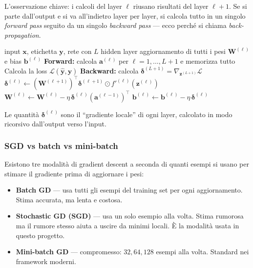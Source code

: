 \documentclass[11pt,a4paper]{article}
\begin{document}
L'osservazione chiave: i calcoli del layer $\ell$ riusano risultati del
layer $\ell+1$. Se si parte dall'output e si va all'indietro layer per
layer, si calcola tutto in un singolo \emph{forward pass} seguito da un
singolo \emph{backward pass} --- ecco perché si chiama
\emph{back-propagation}.

\begin{algorithm}[H]
\caption{Backpropagation (schema concettuale)}
\begin{algorithmic}[1]
\Require input $\bm{x}$, etichetta $\bm{y}$, rete con $L$ hidden layer
\Ensure aggiornamento di tutti i pesi $\bm{W}^{(\ell)}$ e bias $\bm{b}^{(\ell)}$
\State \textbf{Forward:} calcola $\bm{a}^{(\ell)}$ per $\ell = 1, \dots, L+1$ e memorizza tutto
\State Calcola la loss $\mathcal{L}(\hat{\bm{y}}, \bm{y})$
\State \textbf{Backward:} calcola $\bm{\delta}^{(L+1)} = \nabla_{\bm{z}^{(L+1)}} \mathcal{L}$
    \State $\bm{\delta}^{(\ell)} \gets (\bm{W}^{(\ell+1)})^\top \bm{\delta}^{(\ell+1)} \odot f'^{(\ell)}\!(\bm{z}^{(\ell)})$
\EndFor
{}
    \State $\bm{W}^{(\ell)} \gets \bm{W}^{(\ell)} - \eta\, \bm{\delta}^{(\ell)}(\bm{a}^{(\ell-1)})^\top$
    \State $\bm{b}^{(\ell)} \gets \bm{b}^{(\ell)} - \eta\, \bm{\delta}^{(\ell)}$
\EndFor
\end{algorithmic}
\end{algorithm}

Le quantità $\bm{\delta}^{(\ell)}$ sono il ``gradiente locale'' di ogni
layer, calcolato in modo ricorsivo dall'output verso l'input.

\subsubsection{SGD vs batch vs mini-batch}

Esistono tre modalità di gradient descent a seconda di quanti esempi si
usano per stimare il gradiente prima di aggiornare i pesi:
\begin{itemize}
    \item \textbf{Batch GD} --- usa tutti gli esempi del training set
          per ogni aggiornamento. Stima accurata, ma lenta e costosa.
    \item \textbf{Stochastic GD (SGD)} --- usa un solo esempio alla volta.
          Stima rumorosa ma il rumore stesso aiuta a uscire da minimi
          locali. È la modalità usata in questo progetto.
    \item \textbf{Mini-batch GD} --- compromesso: $32, 64, 128$ esempi
          alla volta. Standard nei framework moderni.
\end{itemize}
\end{document}
